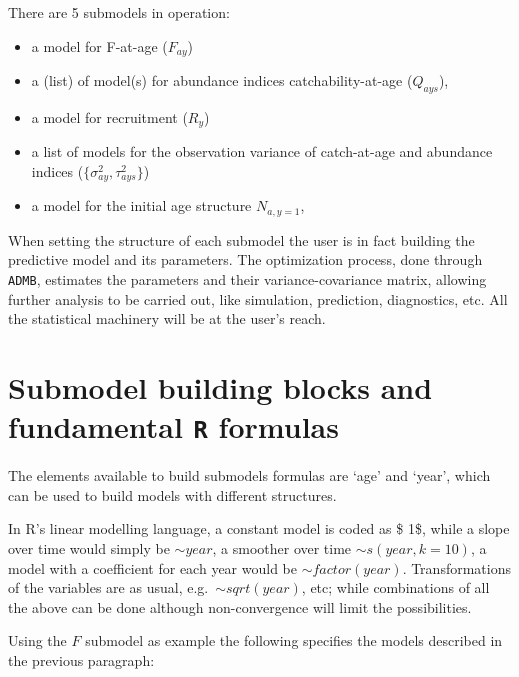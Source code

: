 \documentclass[
]{book}
\providecommand{\tightlist}{%
  \setlength{\itemsep}{0pt}\setlength{\parskip}{0pt}}
\begin{document}
There are 5 submodels in operation:

\begin{itemize}
\tightlist
\item
  a model for F-at-age (\(F_{ay}\))
\item
  a (list) of model(s) for abundance indices catchability-at-age (\(Q_{ays}\)),
\item
  a model for recruitment (\(R_y\))
\item
  a list of models for the observation variance of catch-at-age and abundance indices (\(\{\sigma^2_{ay}, \tau^2_{ays}\}\))
\item
  a model for the initial age structure \(N_{a,y=1}\),
\end{itemize}

When setting the structure of each submodel the user is in fact building the predictive model and its parameters. The optimization process, done through \texttt{ADMB}, estimates the parameters and their variance-covariance matrix, allowing further analysis to be carried out, like simulation, prediction, diagnostics, etc. All the statistical machinery will be at the user's reach.

\hypertarget{submodel-building-blocks-and-fundamental-r-formulas}{%
\section{\texorpdfstring{Submodel building blocks and fundamental \texttt{R} formulas}{Submodel building blocks and fundamental R formulas}}\label{submodel-building-blocks-and-fundamental-r-formulas}}

The elements available to build submodels formulas are `age' and `year', which can be used to build models with different structures.

In R's linear modelling language, a constant model is coded as \$ 1\$, while a slope over time would simply be \(\sim year\), a smoother over time \(\sim s(year, k=10)\), a model with a coefficient for each year would be \(\sim factor(year)\). Transformations of the variables are as usual, e.g.~\(\sim sqrt(year)\), etc; while combinations of all the above can be done although non-convergence will limit the possibilities.

Using the \(F\) submodel as example the following specifies the models described in the previous paragraph:
\end{document}
